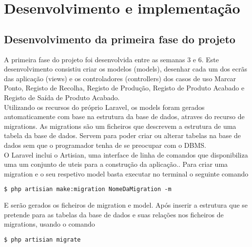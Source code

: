 \chapter{Desenvolvimento e implementação} 
\label{cap:5}


\section{Desenvolvimento da primeira fase do projeto}
A primeira fase do projeto foi desenvolvida entre as semanas 3 e 6. Este desenvolvimento consistiu criar os modelos (models), desenhar cada um dos ecrãs das aplicação (views) e os controladores (controllers) dos casos de uso Marcar Ponto, Registo de Recolha, Registo de Produção, Registo de Produto Acabado e Registo de Saída de Produto Acabado.\\
Utilizando os recursos do próprio Laravel, os models foram gerados automaticamente com base na estrutura da base de dados, atraves do recurso de migrations. As migrations são um ficheiros que descrevem a estrutura de uma tabela da base de dados. Servem para poder criar ou alterar tabelas na base de dados sem que o programador tenha de se preocupar com o DBMS\label{sym:DBMG}.\\
O Laravel inclui o Artisian, uma interface de linha de comandos que disponibiliza uma um conjunto de uteis para a construção da aplicação.\cite{Laravel}.
Para criar uma migration e o seu respetivo model basta executar no terminal o seguinte comando

\begin{lstlisting}
$ php artisian make:migration NomeDaMigration -m
\end{lstlisting}

\noindent
E serão gerados os ficheiros de migration e model. Após inserir a estrutura que se pretende para as tabelas da base de dados e suas relações nos ficheiros de migrations, usando o comando

\begin{lstlisting}
$ php artisian migrate
\end{lstlisting}

